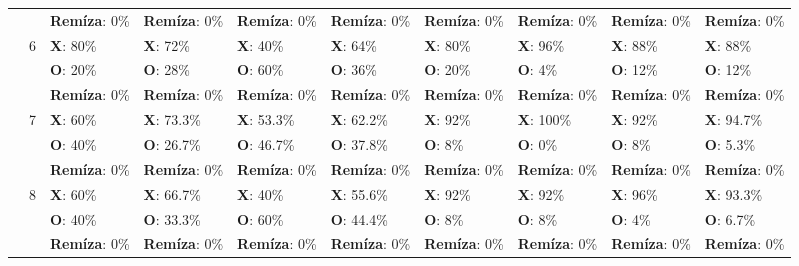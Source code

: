 \begin{table}[H]
\begin{tiny}
\begin{tabular}{|l|l|l|l|l||l|||l|l|l||l|}
            & & \textbf{Remíza}: 0\% & \textbf{Remíza}: 0\% & \textbf{Remíza}: 0\% & \textbf{Remíza}: 0\%               & \textbf{Remíza}: 0\% & \textbf{Remíza}: 0\% & \textbf{Remíza}: 0\% & \textbf{Remíza}: 0\% \\
            \cline{2-10}
            & \multirow{3}{*}{6}
            & \textbf{X}: 80\% & \textbf{X}: 72\% & \textbf{X}: 40\% & \textbf{X}: 64\%                                 & \textbf{X}: 80\% & \textbf{X}: 96\% & \textbf{X}: 88\% & \textbf{X}: 88\% \\
            & & \textbf{O}: 20\% & \textbf{O}: 28\% & \textbf{O}: 60\% & \textbf{O}: 36\%                               & \textbf{O}: 20\% & \textbf{O}: 4\% & \textbf{O}: 12\% & \textbf{O}: 12\% \\
            & & \textbf{Remíza}: 0\% & \textbf{Remíza}: 0\% & \textbf{Remíza}: 0\% & \textbf{Remíza}: 0\%               & \textbf{Remíza}: 0\% & \textbf{Remíza}: 0\% & \textbf{Remíza}: 0\% & \textbf{Remíza}: 0\% \\
            \cline{2-10}
            & \multirow{3}{*}{7}
            & \textbf{X}: 60\% & \textbf{X}: 73.3\% & \textbf{X}: 53.3\% & \textbf{X}: 62.2\%                           & \textbf{X}: 92\% & \textbf{X}: 100\% & \textbf{X}: 92\% & \textbf{X}: 94.7\% \\
            & & \textbf{O}: 40\% & \textbf{O}: 26.7\% & \textbf{O}: 46.7\% & \textbf{O}: 37.8\%                         & \textbf{O}: 8\% & \textbf{O}: 0\% & \textbf{O}: 8\% & \textbf{O}: 5.3\% \\
            & & \textbf{Remíza}: 0\% & \textbf{Remíza}: 0\% & \textbf{Remíza}: 0\% & \textbf{Remíza}: 0\%               & \textbf{Remíza}: 0\% & \textbf{Remíza}: 0\% & \textbf{Remíza}: 0\% & \textbf{Remíza}: 0\% \\
            \cline{2-10}
            & \multirow{3}{*}{8}
            & \textbf{X}: 60\% & \textbf{X}: 66.7\% & \textbf{X}: 40\% & \textbf{X}: 55.6\%                             & \textbf{X}: 92\% & \textbf{X}: 92\% & \textbf{X}: 96\% & \textbf{X}: 93.3\% \\
            & & \textbf{O}: 40\% & \textbf{O}: 33.3\% & \textbf{O}: 60\% & \textbf{O}: 44.4\%                           & \textbf{O}: 8\% & \textbf{O}: 8\% & \textbf{O}: 4\% & \textbf{O}: 6.7\% \\
            & & \textbf{Remíza}: 0\% & \textbf{Remíza}: 0\% & \textbf{Remíza}: 0\% & \textbf{Remíza}: 0\%               & \textbf{Remíza}: 0\% & \textbf{Remíza}: 0\% & \textbf{Remíza}: 0\% & \textbf{Remíza}: 0\% \\

\end{tabular}
\end{tiny}
\end{table}

